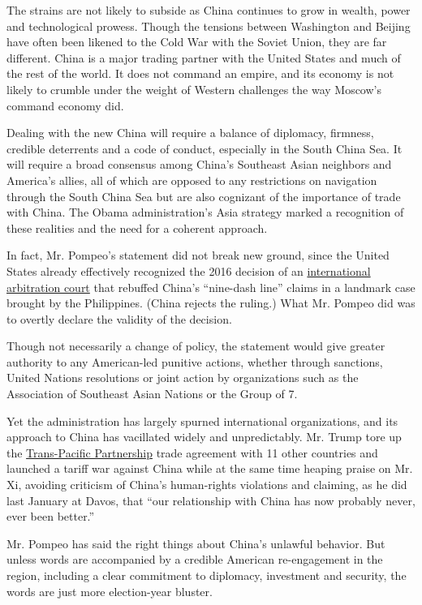 The strains are not likely to subside as China continues to grow in
wealth, power and technological prowess. Though the tensions between
Washington and Beijing have often been likened to the Cold War with the
Soviet Union, they are far different. China is a major trading partner
with the United States and much of the rest of the world. It does not
command an empire, and its economy is not likely to crumble under the
weight of Western challenges the way Moscow's command economy did.

Dealing with the new China will require a balance of diplomacy,
firmness, credible deterrents and a code of conduct, especially in the
South China Sea. It will require a broad consensus among China's
Southeast Asian neighbors and America's allies, all of which are opposed
to any restrictions on navigation through the South China Sea but are
also cognizant of the importance of trade with China. The Obama
administration's Asia strategy marked a recognition of these realities
and the need for a coherent approach.

In fact, Mr. Pompeo's statement did not break new ground, since the
United States already effectively recognized the 2016 decision of an
\href{https://www.nytimes3xbfgragh.onion/2016/07/13/world/asia/south-china-sea-hague-ruling-philippines.html}{international
arbitration court} that rebuffed China's ``nine-dash line'' claims in a
landmark case brought by the Philippines. (China rejects the ruling.)
What Mr. Pompeo did was to overtly declare the validity of the decision.

Though not necessarily a change of policy, the statement would give
greater authority to any American-led punitive actions, whether through
sanctions, United Nations resolutions or joint action by organizations
such as the Association of Southeast Asian Nations or the Group of 7.

Yet the administration has largely spurned international organizations,
and its approach to China has vacillated widely and unpredictably. Mr.
Trump tore up the
\href{https://www.cfr.org/backgrounder/what-trans-pacific-partnership-tpp}{Trans-Pacific
Partnership} trade agreement with 11 other countries and launched a
tariff war against China while at the same time heaping praise on Mr.
Xi, avoiding criticism of China's human-rights violations and claiming,
as he did last January at Davos, that ``our relationship with China has
now probably never, ever been better.''

Mr. Pompeo has said the right things about China's unlawful behavior.
But unless words are accompanied by a credible American re-engagement in
the region, including a clear commitment to diplomacy, investment and
security, the words are just more election-year bluster.

